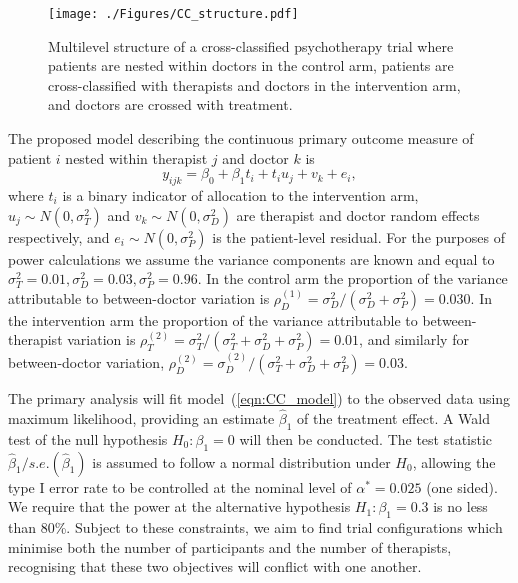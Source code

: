 \documentclass{article} %
\begin{document}
\begin{figure}
\centering
\texttt{[image: ./Figures/CC\_structure.pdf]}
\caption{Multilevel structure of a cross-classified psychotherapy trial where patients are nested within doctors in the control arm, patients are cross-classified with therapists and doctors in the intervention arm, and doctors are crossed with treatment.}
\label{fig:CC_structure}
\end{figure}

The proposed model describing the continuous primary outcome measure of patient $i$ nested within therapist $j$ and doctor $k$ is
\begin{equation}\label{eqn:CC_model}
y_{ijk} = \beta_{0} + \beta_{1}t_{i} + t_{i}u_{j} + v_{k} + e_{i},
\end{equation}
where $t_{i}$ is a binary indicator of allocation to the intervention arm, $u_{j} \sim N(0, \sigma_{T}^{2})$ and $v_{k} \sim N(0, \sigma_{D}^{2})$ are therapist and doctor random effects respectively, and $e_{i} \sim N(0, \sigma_{P}^{2})$ is the patient-level residual. For the purposes of power calculations we assume the variance components are known and equal to $\sigma_{T}^{2} = 0.01, \sigma_{D}^{2} = 0.03, \sigma_{P}^{2} = 0.96$. In the control arm the proportion of the variance attributable to between-doctor variation is $\rho_{D}^{(1)} = \sigma^{2}_{D}/(\sigma^{2}_{D} + \sigma^{2}_{P}) = 0.030$. In the intervention arm the proportion of the variance attributable to between-therapist variation is $\rho_{T}^{(2)} = \sigma^{2}_{T}/(\sigma^{2}_{T} + \sigma^{2}_{D} + \sigma^{2}_{P}) = 0.01$, and similarly for between-doctor variation, $\rho_{D}^{(2)} = \sigma^{(2)}_{D}/(\sigma^{2}_{T} + \sigma^{2}_{D} + \sigma^{2}_{P}) = 0.03$.

The primary analysis will fit model~(\ref{eqn:CC_model}) to the observed data using maximum likelihood, providing an estimate $\hat{\beta}_{1}$ of the treatment effect. A Wald test of the null hypothesis $H_{0}: \beta_{1} = 0$ will then be conducted. The test statistic $\hat{\beta}_{1} / s.e.(\hat{\beta}_{1})$ is assumed to follow a normal distribution under $H_{0}$, allowing the type I error rate to be controlled at the nominal level of $\alpha^{*} = 0.025$ (one sided). We require that the power at the alternative hypothesis $H_{1}: \beta_{1} = 0.3$ is no less than 80\%. Subject to these constraints, we aim to find trial configurations which minimise both the number of participants and the number of therapists, recognising that these two objectives will conflict with one another.
\end{document}
